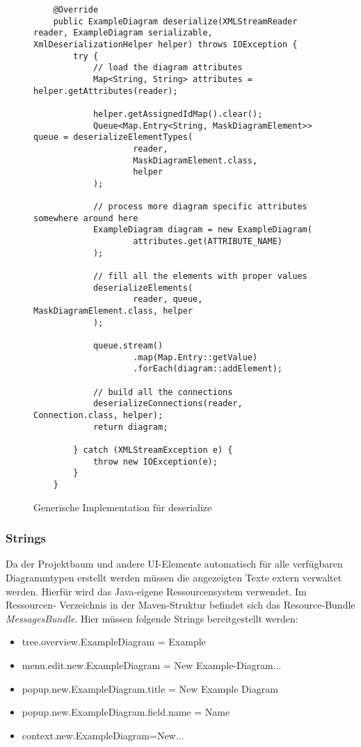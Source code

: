 \begin{figure}[H]
	\centering
	\begin{lstlisting}
    @Override
    public ExampleDiagram deserialize(XMLStreamReader reader, ExampleDiagram serializable, XmlDeserializationHelper helper) throws IOException {
        try {
            // load the diagram attributes
            Map<String, String> attributes = helper.getAttributes(reader);

            helper.getAssignedIdMap().clear();
            Queue<Map.Entry<String, MaskDiagramElement>> queue = deserializeElementTypes(
                    reader,
                    MaskDiagramElement.class,
                    helper
            );

            // process more diagram specific attributes somewhere around here
            ExampleDiagram diagram = new ExampleDiagram(
                    attributes.get(ATTRIBUTE_NAME)
            );

            // fill all the elements with proper values
            deserializeElements(
                    reader, queue, MaskDiagramElement.class, helper
            );
            
            queue.stream()
                    .map(Map.Entry::getValue)
                    .forEach(diagram::addElement);

            // build all the connections
            deserializeConnections(reader, Connection.class, helper);
            return diagram;

        } catch (XMLStreamException e) {
            throw new IOException(e);
        }
    }
	\end{lstlisting}
	\caption{Generische Implementation für deserialize}
\end{figure}


\subsubsection{Strings}
Da der Projektbaum und andere UI-Elemente automatisch für alle verfügbaren Diagrammtypen erstellt werden müssen
die angezeigten Texte extern verwaltet werden. Hierfür wird das Java-eigene Ressourcensystem verwendet. Im Ressourcen-
Verzeichnis in der Maven-Struktur befindet sich das Resource-Bundle \textit{MessagesBundle}. Hier müssen folgende Strings
bereitgestellt werden:

\begin{itemize}
	\item tree.overview.ExampleDiagram = Example
	\item menu.edit.new.ExampleDiagram = New Example-Diagram...
	\item popup.new.ExampleDiagram.title = New Example Diagram
	\item popup.new.ExampleDiagram.field.name = Name
	\item context.new.ExampleDiagram=New...
\end{itemize}

